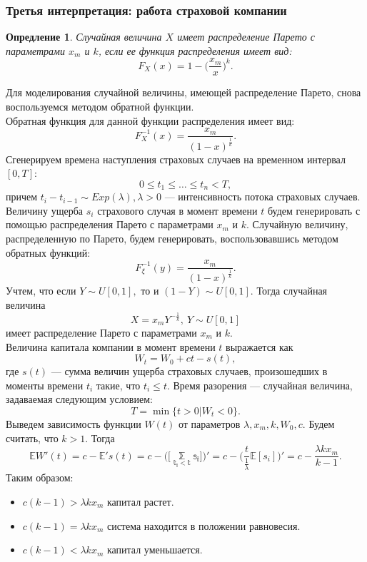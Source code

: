 \documentclass[11pt]{article}
\newtheorem{definition}{Опредление}
\numberwithin{equation}{section}
\begin{document}
\subsubsection{Третья интерпретация: работа страховой компании}
\begin{definition}
	Случайная величина $X$ имеет распределение Парето с параметрами $x_m$ и $k$, если ее функция распределения имеет вид:
	\[ F_X(x) = 1 - \bigg(\frac{x_m}{x}\bigg)^k. \]
\end{definition}
Для моделирования случайной величины, имеющей распределение Парето, снова воспользуемся методом обратной функции.\\
Обратная функция для данной функции распределения имеет вид:
\[ F^{-1}_X(x) = \frac{x_m}{(1 - x)^\frac{1}{k}}. \]
Сгенерируем времена наступления страховых случаев на временном интервал $[0,T]$:
\[ 0 \leq t_1 \leq \dots \leq t_n < T, \]
причем $t_i - t_{i-1} \sim Exp(\lambda), \lambda > 0$ --- интенсивность потока страховых случаев.\\
Величину ущерба $s_i$ страхового случая в момент времени $t$ будем генерировать с помощью распределения Парето с параметрами $x_m$ и $k$. Случайную величину, распределенную по Парето, будем генерировать, воспользовавшись методом обратных функций:
\[ F^{-1}_\xi (y) = \frac{x_m}{(1-x)^\frac{1}{k}}. \]
Учтем, что если $Y \sim U[0,1],$ то и $(1 - Y) \sim U[0,1]$. Тогда случайная величина
\[ X = x_m Y^{-\frac{1}{k}}, \ Y \sim U[0,1] \]
имеет распределение Парето с параметрами $x_m$ и  $k$.\\
Величина капитала компании в момент времени $t$ выражается как
\[ W_t = W_0 + ct - s(t), \]
где $s(t)$ --- сумма величин ущерба страховых случаев, произошедших в моменты времени $t_i$ такие, что $t_i \leq t$. Время разорения --- случайная величина, задаваемая следующим условием:
\[ T = \min \{t > 0| W_t < 0 \}.\]
Выведем зависимость функции $W(t)$ от параметров $\lambda, x_m, k,W_0,c.$ Будем считать, что $k > 1$. Тогда 
\[\mathbb{E}W'(t) = c - \mathbb{E}'s(t) = c - \bigg( \mathbb{\bigg[\sum_{t_i < t}^{}s_i\bigg]} \bigg)' = c - \bigg(\frac{t}{\frac{1}{\lambda}}\mathbb{E}[s_i]\bigg)'=c - \frac{\lambda k x_m}{k -1}.\]
Таким образом:
\begin{itemize}
	\item $c(k-1) > \lambda kx_m$ капитал растет.
	\item $c(k-1) = \lambda kx_m$ система находится в положении равновесия.
	\item $c(k-1) < \lambda kx_m$ капитал уменьшается.
\end{itemize}
\end{document}
